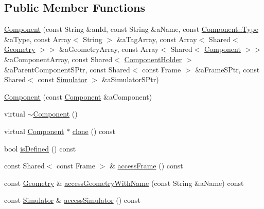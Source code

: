 \subsection*{Public Member Functions}
\begin{DoxyCompactItemize}
\item 
\hyperlink{classostk_1_1simulation_1_1_component_ab3711f34980c3fdb746ff83b9511a25c}{Component} (const String \&an\+Id, const String \&a\+Name, const \hyperlink{classostk_1_1simulation_1_1_component_a1d2ded63a8ab0bd81e27f25921be1e20}{Component\+::\+Type} \&a\+Type, const Array$<$ String $>$ \&a\+Tag\+Array, const Array$<$ Shared$<$ \hyperlink{classostk_1_1simulation_1_1component_1_1_geometry}{Geometry} $>$$>$ \&a\+Geometry\+Array, const Array$<$ Shared$<$ \hyperlink{classostk_1_1simulation_1_1_component}{Component} $>$$>$ \&a\+Component\+Array, const Shared$<$ \hyperlink{classostk_1_1simulation_1_1utilities_1_1_component_holder}{Component\+Holder} $>$ \&a\+Parent\+Component\+S\+Ptr, const Shared$<$ const Frame $>$ \&a\+Frame\+S\+Ptr, const Shared$<$ const \hyperlink{classostk_1_1simulation_1_1_simulator}{Simulator} $>$ \&a\+Simulator\+S\+Ptr)
\item 
\hyperlink{classostk_1_1simulation_1_1_component_a5395700f491da619eb45b0148a5727d5}{Component} (const \hyperlink{classostk_1_1simulation_1_1_component}{Component} \&a\+Component)
\item 
virtual \hyperlink{classostk_1_1simulation_1_1_component_a57f790fdbb03f777e59d73218d2899ef}{$\sim$\+Component} ()
\item 
virtual \hyperlink{classostk_1_1simulation_1_1_component}{Component} $\ast$ \hyperlink{classostk_1_1simulation_1_1_component_a36cdd3498146b23e3ff67b95cd1c59cc}{clone} () const
\item 
bool \hyperlink{classostk_1_1simulation_1_1_component_a983ee8f3974fc2900f21d3bea12fb877}{is\+Defined} () const
\item 
const Shared$<$ const Frame $>$ \& \hyperlink{classostk_1_1simulation_1_1_component_a3e7acecda5a9286bc4baf1d3b6bbd7d5}{access\+Frame} () const
\item 
const \hyperlink{classostk_1_1simulation_1_1component_1_1_geometry}{Geometry} \& \hyperlink{classostk_1_1simulation_1_1_component_afe2d126a21b7a96d0b3655ebcac3a6be}{access\+Geometry\+With\+Name} (const String \&a\+Name) const
\item 
const \hyperlink{classostk_1_1simulation_1_1_simulator}{Simulator} \& \hyperlink{classostk_1_1simulation_1_1_component_a0e119aa1a610b08b935789a7ecb19605}{access\+Simulator} () const

\end{DoxyCompactItemize}
